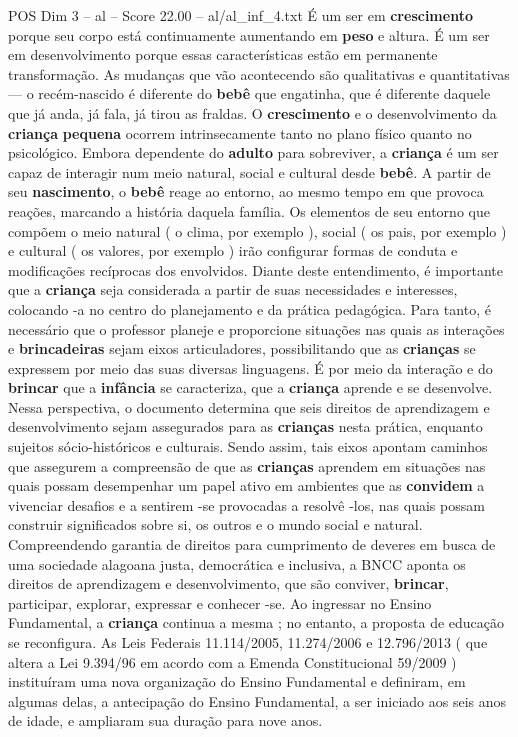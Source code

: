 \begin{textsample}{POS Dim 3 – al – Score 22.00 – al/al\_inf\_4.txt}
É um ser em \textbf{crescimento} porque seu corpo está continuamente aumentando em \textbf{peso} e altura.
É um ser em desenvolvimento porque essas características estão em permanente transformação.
As mudanças que vão acontecendo são qualitativas e quantitativas — o recém-nascido é diferente do \textbf{bebê} que engatinha, que é diferente daquele que já anda, já fala, já tirou as fraldas.
O \textbf{crescimento} e o desenvolvimento da \textbf{criança} \textbf{pequena} ocorrem intrinsecamente tanto no plano físico quanto no psicológico.
Embora dependente do \textbf{adulto} para sobreviver, a \textbf{criança} é um ser capaz de interagir num meio natural, social e cultural desde \textbf{bebê}.
A partir de seu \textbf{nascimento}, o \textbf{bebê} reage ao entorno, ao mesmo tempo em que provoca reações, marcando a história daquela família.
Os elementos de seu entorno que compõem o meio natural ( o clima, por exemplo ), social ( os pais, por exemplo ) e cultural ( os valores, por exemplo ) irão configurar formas de conduta e modificações recíprocas dos envolvidos.
Diante deste entendimento, é importante que a \textbf{criança} seja considerada a partir de suas necessidades e interesses, colocando -a no centro do planejamento e da prática pedagógica.
Para tanto, é necessário que o professor planeje e proporcione situações nas quais as interações e \textbf{brincadeiras} sejam eixos articuladores, possibilitando que as \textbf{crianças} se expressem por meio das suas diversas linguagens.
É por meio da interação e do \textbf{brincar} que a \textbf{infância} se caracteriza, que a \textbf{criança} aprende e se desenvolve.
Nessa perspectiva, o documento determina que seis direitos de aprendizagem e desenvolvimento sejam assegurados para as \textbf{crianças} nesta prática, enquanto sujeitos sócio-históricos e culturais.
Sendo assim, tais eixos apontam caminhos que assegurem a compreensão de que as \textbf{crianças} aprendem em situações nas quais possam desempenhar um papel ativo em ambientes que as \textbf{convidem} a vivenciar desafios e a sentirem -se provocadas a resolvê -los, nas quais possam construir significados sobre si, os outros e o mundo social e natural.
Compreendendo garantia de direitos para cumprimento de deveres em busca de uma sociedade alagoana justa, democrática e inclusiva, a BNCC aponta os direitos de aprendizagem e desenvolvimento, que são conviver, \textbf{brincar}, participar, explorar, expressar e conhecer -se.
Ao ingressar no Ensino Fundamental, a \textbf{criança} continua a mesma ; no entanto, a proposta de educação se reconfigura.
As Leis Federais 11.114/2005, 11.274/2006 e 12.796/2013 ( que altera a Lei 9.394/96 em acordo com a Emenda Constitucional 59/2009 ) instituíram uma nova organização do Ensino Fundamental e definiram, em algumas delas, a antecipação do Ensino Fundamental, a ser iniciado aos seis anos de idade, e ampliaram sua duração para nove anos.

\end{textsample}
